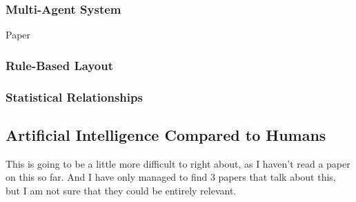 \subsubsection*{Multi-Agent System}
Paper \cite{real-time-walkthroughs}
\subsubsection*{Rule-Based Layout}

\subsubsection*{Statistical Relationships}


\subsection{Artificial Intelligence Compared to Humans}
This is going to be a little more difficult to right about, as I haven't read a paper on this so far.
And I have only managed to find 3 papers that talk about this, but I am not sure that they could be entirely relevant.